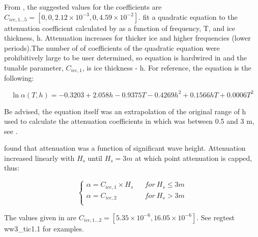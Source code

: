 \noindent
From \cite{art:MBK14}, the suggested values for the coefficients are ${C_{ice,1...5}}=[0, 0, 2.12\times 10^{-3}, 0, 4.59\times 10^{-2}]$. \cite{art:HT15} fit a quadratic equation to the attenuation coefficient calculated by \cite{art:KM08} as a function of frequency, T, and ice thickness, h. Attenuation increases for thicker ice and higher frequencies (lower periods).The number of of coefficients of the quadratic equation were prohibitively large to be user determined, so equation is hardwired in and the tunable parameter, ${C_{ice,1}}$, is ice thickness - h. For reference, the equation is the following:

\begin{equation}\label{eq:ice3}
  {\ln{\alpha(T,h)}} = -0.3203 + 2.058h - 0.9375T - 0.4269h^2 + 0.1566hT + 0.0006T^2
\end{equation}

\noindent
Be advised, the equation itself was an extrapolation of the original range of h used to calculate the attenuation coefficients in \cite{art:KM08} which was between 0.5 and 3 m, see \cite{art:HT15}. 

\cite{art:Ko14} found that attenuation was a function of significant wave height. Attenuation increased linearly with ${H_s}$ until ${H_s} = 3 m$ at which point attenuation is capped, thus:

\begin{equation}
\left \{
\begin{array}{ccrcl}
{\alpha} = {C_{ice,1}}\times {H_s}   & & for \> {H_s} \leq 3 m  \\
{\alpha} = {C_{ice,2}}               & & for \> {H_s} > 3 m     \\
\end{array} \right .
\end{equation}

The values given in \cite{art:Ko14} are ${C_{ice,1...2}}=[5.35\times 10^{-6}, 16.05\times 10^{-6}]$. See regtest {\file ww3\_tic1.1} for examples.


